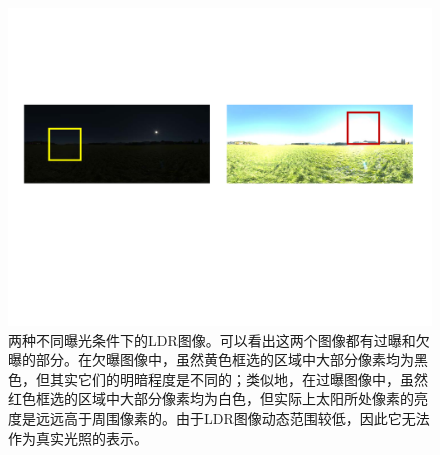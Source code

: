 \begin{figure}[!htbp]
    \centering
    \includegraphics[width=1.0\textwidth]{Img/different-exposure.pdf}
    \caption[使用不同曝光拍摄的LDR图像]
    {两种不同曝光条件下的LDR图像。可以看出这两个图像都有过曝和欠曝的部分。在欠曝图像中，虽然黄色框选的区域中大部分像素均为黑色，但其实它们的明暗程度是不同的；类似地，在过曝图像中，虽然红色框选的区域中大部分像素均为白色，但实际上太阳所处像素的亮度是远远高于周围像素的。由于LDR图像动态范围较低，因此它无法作为真实光照的表示。}
    \label{fig:different-exposure}
\end{figure}